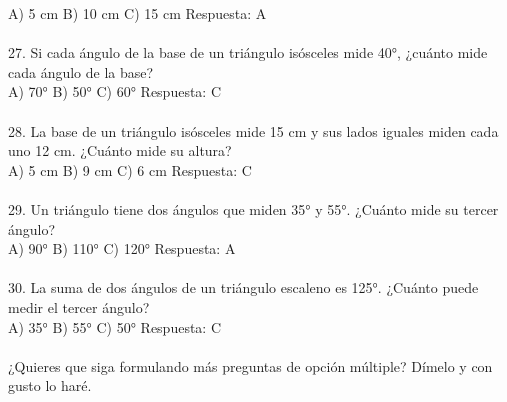 \documentclass{article}
\begin{document}
A) 5 cm   B) 10 cm   C) 15 cm   Respuesta: A \\
\\
27. Si cada ángulo de la base de un triángulo isósceles mide 40°, ¿cuánto mide cada ángulo de la base?  \\
A) 70°   B) 50°   C) 60°   Respuesta: C\\
\\
28. La base de un triángulo isósceles mide 15 cm y sus lados iguales miden cada uno 12 cm. ¿Cuánto mide su altura?\\
A) 5 cm   B) 9 cm   C) 6 cm   Respuesta: C\\
\\
29. Un triángulo tiene dos ángulos que miden 35° y 55°. ¿Cuánto mide su tercer ángulo?\\
A) 90°   B) 110°   C) 120°   Respuesta: A  \\
\\
30. La suma de dos ángulos de un triángulo escaleno es 125°. ¿Cuánto puede medir el tercer ángulo? \\
A) 35°   B) 55°   C) 50°   Respuesta: C\\
\\
¿Quieres que siga formulando más preguntas de opción múltiple? Dímelo y con gusto lo haré.\\
\end{document}

